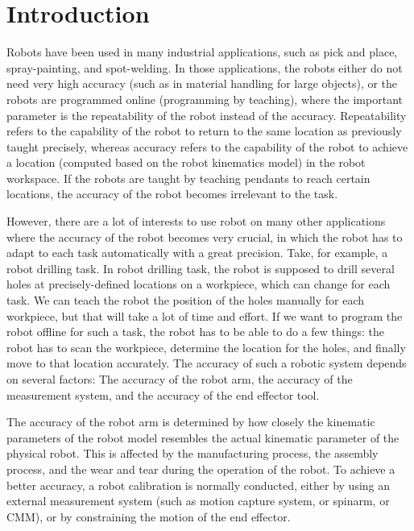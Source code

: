 \section{Introduction}
\label{sec:introduction}

Robots have been used in many industrial applications, such as pick and place, spray-painting, and spot-welding. In those applications, the robots either do not need very high accuracy (such as in material handling for large objects), or the robots are programmed online (programming by teaching), where the important parameter is the repeatability of the robot instead of the accuracy. Repeatability refers to the capability of the robot to return to the same location as previously taught precisely, whereas accuracy refers to the capability of the robot to achieve a location (computed based on the robot kinematics model) in the robot workspace. If the robots are taught by teaching pendants to reach certain locations, the accuracy of the robot becomes irrelevant to the task. 

However, there are a lot of interests to use robot on many other applications where the accuracy of the robot becomes very crucial, in which the robot has to adapt to each task automatically with a great precision. Take, for example, a robot drilling task. In robot drilling task, the robot is supposed to drill several holes at precisely-defined locations on a workpiece, which can change for each task. We can teach the robot the position of the holes manually for each workpiece, but that will take a lot of time and effort. If we want to program the robot offline for such a task, the robot has to be able to do a few things: the robot has to scan the workpiece, determine the location for the holes, and finally
move to that location accurately. The accuracy of such a robotic system depends on several factors: The accuracy of the robot arm, the accuracy of the measurement system, and the accuracy of the end effector tool. 

The accuracy of the robot arm is determined by how closely the kinematic parameters of the robot model resembles the actual kinematic parameter of the physical robot. This is affected by the manufacturing process, the assembly process, and the wear and tear during the operation of the robot. To achieve a better accuracy, a robot calibration is normally conducted, either by using an external measurement system (such as motion capture system, or spinarm, or CMM), or by constraining the motion of the end effector. 

